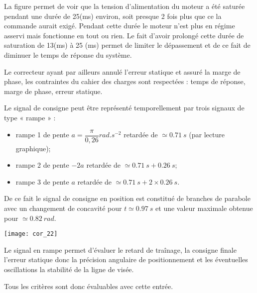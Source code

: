 \question{}
\ifprof
\begin{corrige}
La figure permet de voir que la tension d'alimentation du moteur a été saturée pendant une durée 
de 25(ms) environ, soit presque 2 fois plus que ce la commande aurait exigé. Pendant cette durée le 
moteur n'est plus en régime asservi mais fonctionne en tout ou rien. Le fait d'avoir prolongé cette 
durée de saturation de 13(ms) à 25 (ms) permet de limiter le dépassement et de ce fait de diminuer 
le temps de réponse du système.
 
Le correcteur ayant par ailleurs annulé l'erreur statique et assuré la marge de phase, les contraintes 
du cahier des charges sont respectées : temps de réponse, marge de phase, erreur statique.

\end{corrige}
\else
\fi


\question{}
\ifprof
\begin{corrige}
Le signal de consigne peut être représenté temporellement par trois signaux de type « rampe » :
\begin{itemize}
\item rampe 1 de pente $a=\dfrac{\pi}{0,26} \si{rad.s^{-2}}$ retardée de $\simeq \SI{0,71}{s}$ (par lecture graphique);
\item rampe 2 de pente $-2a$ retardée de $\simeq \SI{0,71}{s}+\SI{0,26}{s}$;
\item rampe 3 de pente $a$ retardée de  $\simeq \SI{0,71}{s}+2\times \SI{0,26}{s}$.
\end{itemize}
De ce fait le signal de consigne en position est constitué de branches de parabole avec un changement de concavité pour $t\simeq \SI{0,97}{s}$ et une valeur maximale obtenue pour  $\simeq \SI{0,82}{rad}$.

\begin{center}
\texttt{[image: cor\_22]}
\end{center}

\end{corrige}
\else
\fi


\question{}
\ifprof
\begin{corrige}
Le signal en rampe permet d'évaluer le retard de traînage, la consigne finale l'erreur statique donc la
précision angulaire de positionnement et les éventuelles oscillations la stabilité de la ligne de visée.

Tous les critères sont donc évaluables avec cette entrée. 

\end{corrige}
\else
\fi



